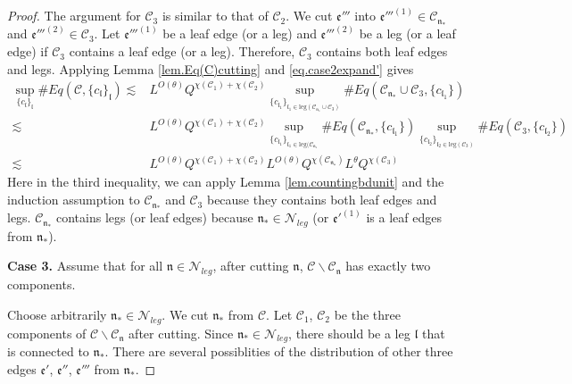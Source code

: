 \begin{proof}
The argument for $\mathcal{C}_3$ is similar to that of $\mathcal{C}_2$. We cut $\mathfrak{e}'''$ into $\mathfrak{e}'''^{(1)}\in  \mathcal{C}_{\mathfrak{n}_*}$ and $\mathfrak{e}'''^{(2)}\in  \mathcal{C}_3$. Let $\mathfrak{e}'''^{(1)}$ be a leaf edge (or a leg) and $\mathfrak{e}'''^{(2)}$ be a leg (or a leaf edge) if $\mathcal{C}_3$ contains a leaf edge (or a leg). Therefore, $\mathcal{C}_3$ contains both leaf edges and legs. Applying Lemma \ref{lem.Eq(C)cutting} and \eqref{eq.case2expand'} gives
\begin{equation}
\begin{split}
    \sup_{\{c_{\mathfrak{l}}\}_{\mathfrak{l}}}\#Eq(\mathcal{C},\{c_{\mathfrak{l}}\}_{\mathfrak{l}})
    \lesssim& L^{O(\theta)} Q^{\chi(\mathcal{C}_1)+\chi(\mathcal{C}_2)}\sup_{\{c_{\mathfrak{l}_1}\}_{\mathfrak{l}_1\in \text{leg}(\mathcal{C}_{\mathfrak{n}_*}\cup \mathcal{C}_3)} } \# Eq(\mathcal{C}_{\mathfrak{n}_*}\cup \mathcal{C}_3,\{c_{\mathfrak{l}_1}\}) 
    \\
    \lesssim&  L^{O(\theta)} Q^{\chi(\mathcal{C}_1)+\chi(\mathcal{C}_2)}\sup_{\{c_{\mathfrak{l}_1}\}_{\mathfrak{l}_1\in \text{leg}(\mathcal{C}_{\mathfrak{n}_*}} } \# Eq(\mathcal{C}_{\mathfrak{n}_*},\{c_{\mathfrak{l}_1}\}) \sup_{\{c_{\mathfrak{l}_2}\}_{\mathfrak{l}_2\in \text{leg}(\mathcal{C}_3)} }\# Eq(\mathcal{C}_{3}, \{c_{\mathfrak{l}_2}\})
    \\
    \lesssim& L^{O(\theta)} Q^{\chi(\mathcal{C}_1)+\chi(\mathcal{C}_2)} L^{O(\theta)} Q^{\chi(\mathcal{C}_{\mathfrak{n}_*})} L^\theta Q^{\chi(\mathcal{C}_3)} 
\end{split}
\end{equation}
Here in the third inequality, we can apply Lemma \ref{lem.countingbdunit} and the induction assumption to $\mathcal{C}_{\mathfrak{n}_*}$ and $\mathcal{C}_3$ because they contains both leaf edges and legs. $\mathcal{C}_{\mathfrak{n}_*}$ contains legs (or leaf edges) because $\mathfrak{n}_*\in\mathcal{N}_{leg}$ (or $\mathfrak{e}'^{(1)}$ is a leaf edges from $\mathfrak{n}_*$).

\textbf{Case 3.} Assume that for all $\mathfrak{n}\in \mathcal{N}_{leg}$, after cutting $\mathfrak{n}$, $\mathcal{C}\backslash \mathcal{C}_{\mathfrak{n}}$ has exactly two components.

Choose arbitrarily $\mathfrak{n}_*\in \mathcal{N}_{leg}$. We cut $\mathfrak{n}_*$ from $\mathcal{C}$. Let $\mathcal{C}_1$, $\mathcal{C}_2$ be the three components of $\mathcal{C}\backslash \mathcal{C}_{\mathfrak{n}}$ after cutting. Since $\mathfrak{n}_*\in \mathcal{N}_{leg}$, there should be a leg $\mathfrak{l}$ that is connected to $\mathfrak{n}_*$. There are several possiblities of the distribution of other three edges $\mathfrak{e}'$, $\mathfrak{e}''$, $\mathfrak{e}'''$ from $\mathfrak{n}_*$.  


\end{proof}
